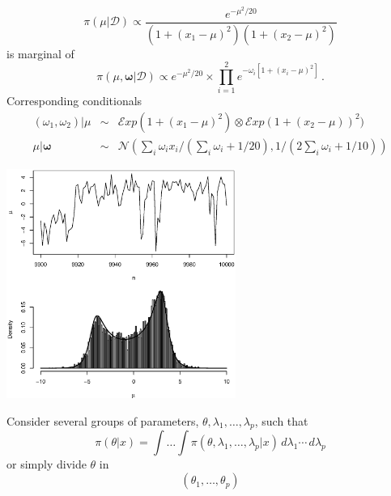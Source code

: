 \begin{slide}

\begin{example}
$$
\pi(\mu|\mathscr{D}) \propto \frac{e^{-\mu^2/20}}{(1+(x_1-\mu)^2)(1+(x_2-\mu)^2)}
$$
is marginal of
$$
\pi(\mu,\boldsymbol{\omega} |\mathscr{D}) \propto e^{-\mu^2/20} \times \prod_{i=1}^2 e^{-\omega_i[1+(x_i-\mu)^2]}\,.
$$
\pause
Corresponding conditionals
\small
\begin{eqnarray*}
(\omega_1,\omega_2) | \mu  & \sim & \mathscr{E}xp(1+(x_1-\mu)^2) \otimes \mathscr{E}xp(1+(x_2-\mu))^2) \\
\mu | \boldsymbol{\omega}  & \sim & \mathscr{N}\left(\sum_i\omega_i x_i/(\sum_i\omega_i +1/20),1/(2\sum_i\omega_i +1/10)\right)
\end{eqnarray*}
\normalsize
\end{example}

\end{slide}\begin{slide}

\centerline{\includegraphics[width=7.5cm]{figures/simplegibbs.eps}}

\end{slide}\begin{slide}

Consider several groups of parameters, 
$\theta,\lambda_1,\allowbreak\ldots,\lambda_p$, such that
\[
\pi(\theta|x) = \int\ldots\int \pi(\theta,\lambda_1,\ldots,\lambda_p|x)
   \,d\lambda_1 \cdots \,d\lambda_p
\]
or simply divide $\theta$ in 
$$
(\theta_1,\ldots,\theta_p)
$$

\end{slide}\begin{slide}


\end{slide}
